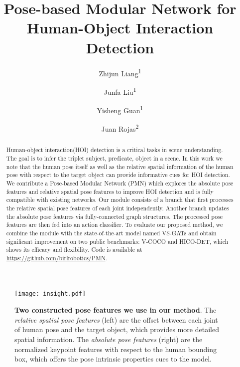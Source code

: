 \documentclass[10pt,twocolumn,letterpaper]{article}
\begin{document}
\title{Pose-based Modular Network for
Human-Object Interaction Detection}
\author{Zhijun Liang\textsuperscript{1}}
\author{Junfa Liu\textsuperscript{1}}
\author{Yisheng Guan\textsuperscript{1}}
\author{Juan Rojas\textsuperscript{2}}
\maketitle
\begin{abstract}
Human-object interaction(HOI) detection is a critical tasks in scene understanding. The goal is to infer the triplet subject, predicate, object in a scene.   
In this work we note that the human pose itself as well as the relative spatial information of the human pose with respect to the target object can provide informative cues for HOI detection.
We contribute a Pose-based Modular Network (PMN) which explores the absolute pose features and relative spatial pose features to improve HOI detection and is fully compatible with existing networks. Our module consists of a branch that first processes the relative spatial pose features of each joint independently. Another branch updates the absolute pose features via fully-connected graph structures. The processed pose features are then fed into an action classifier. To evaluate our proposed method, we combine the module with the state-of-the-art model named VS-GATs and obtain significant improvement on two public benchmarks: V-COCO and HICO-DET, which shows its efficacy and flexibility.
Code is available at \url{https://github.com/birlrobotics/PMN}. 
\end{abstract}

\begin{figure}[t]
  \begin{center}
      \texttt{[image: insight.pdf]}
  \end{center}
      \caption{
        \textbf{Two constructed pose features we use in our method}. The \textit{relative spatial pose features} (left) are the offset between each joint of human pose and the target object, which provides more detailed spatial information. The \textit{absolute pose features} (right) are the normalized keypoint features with respect to the human bounding box, which offers the pose intrinsic properties cues to the model.
      }
  \label{fig:insight_picture}
\end{figure}
\end{document}
